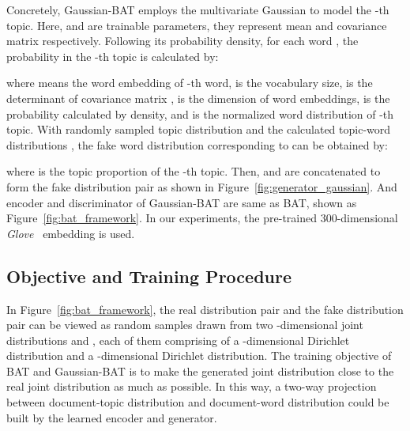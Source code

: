 \documentclass[11pt,a4paper]{article}
\begin{document}
Concretely, Gaussian-BAT employs the multivariate Gaussian  to model the -th topic. Here,  and  are trainable parameters, they represent mean and covariance matrix respectively. Following its probability density, for each word , the probability in the -th topic  is calculated by:

where  means the word embedding of -th word,  is the vocabulary size,  is the determinant of covariance matrix ,  is the dimension of word embeddings,  is the probability calculated by density, and  is the normalized word distribution of -th topic. 
With randomly sampled topic distribution  and the calculated topic-word distributions , the fake word distribution  corresponding to  can be obtained by: 

where  is the topic proportion of the -th topic. Then,  and  are concatenated to form the fake distribution pair  as shown in Figure~\ref{fig:generator_gaussian}. And encoder and discriminator of Gaussian-BAT are same as BAT, shown as Figure~\ref{fig:bat_framework}. In our experiments, the pre-trained 300-dimensional \emph{Glove}~\cite{pennington2014glove} embedding is used. 


\subsection{Objective and Training Procedure}

In Figure~\ref{fig:bat_framework}, the real distribution pair  and the fake distribution pair  can be viewed as random samples drawn from two -dimensional joint distributions  and , each of them comprising of a -dimensional Dirichlet distribution and a -dimensional Dirichlet distribution.  The training objective of BAT and Gaussian-BAT is to make the generated joint distribution  close to the real joint distribution  as much as possible. In this way, a two-way projection between document-topic distribution and document-word distribution could be built by the learned encoder and generator.
\end{document}
